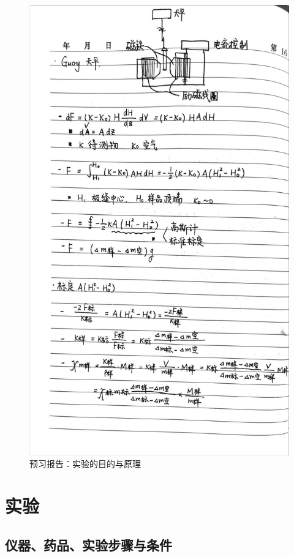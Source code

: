 \documentclass[cn,hazy,pku,12pt,normal,math=newtx,cite=super]{elegantnote}
\begin{document}
\begin{figure}[H]
    \centering
    \includegraphics[width=.75\textwidth]{figures/0-2.jpg}
    \caption{预习报告：实验的目的与原理}
\end{figure}
\newpage

\section{实验}

\subsection{仪器、药品、实验步骤与条件}
\end{document}
